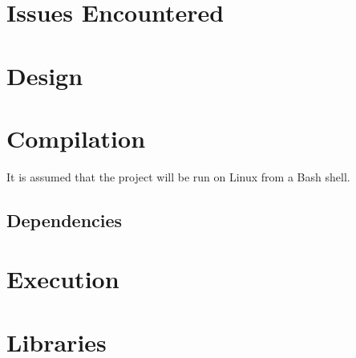 \documentclass[10pt, a4paper]{article}
\begin{document}
\section{Issues Encountered}
\label{sec:issues}



\section{Design}
\label{sec:design}


\section{Compilation}
\label{sec:comp}

It is assumed that the project will be run on Linux from a Bash shell.

\subsection{Dependencies}
\label{subsec:deps}


\section{Execution}
\label{sec:exec}


\section{Libraries}
\label{sec:libs}
\end{document}

